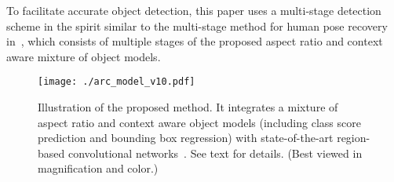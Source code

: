 \documentclass[10pt,twocolumn,letterpaper]{article}
\begin{document}
To facilitate accurate object detection, this paper uses a multi-stage detection scheme in the spirit similar to the multi-stage method for human pose recovery in~\cite{cao2016realtime}, which consists of multiple stages of the proposed aspect ratio and context aware mixture of object models.  

\iffalse{
The experimental results show the integration of aspect ratio and context can benefit the widely used R-CNN based object detection systems significantly. 
}\fi

\begin{figure} %
\centering
{\texttt{[image: ./arc\_model\_v10.pdf]}}
\caption{Illustration of the proposed method. It integrates a mixture of aspect ratio and context aware object models (including class score prediction and bounding box regression) with state-of-the-art region-based convolutional networks~\cite{faster_rcnn,rfcn}. See text for details. (Best viewed in magnification and color.) %
}
\vspace{-3mm} 
\label{fig:model}
\end{figure} 

\vspace{-1mm}
\end{document}
